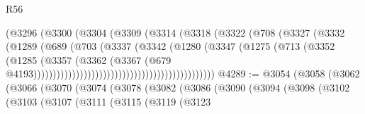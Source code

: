 \begin{lexlean}{R56}
\begin{coremodule}
{{{{{{{{{{{{{{{{{{{{{{{{{{{{{{{{{{{{{{{{{{{{{{{{{{{{{{{{{{{{{{{{{{{{{{{{{{{{{{{{{{{{{{{{{{{{{{{{{{{{{{{{{{{{{{{{{{{{{{{{{{{{{{{{{{{{{{{{{{{{{{{{{{{{{{{{{{{{{{{{{{{{{{{{{{{{{{{{{{{{{{{{{{{{{{{{{{{{{{{{{{{{{{{{{{{                                                (@3296
                                                  (@3300
                                                    (@3304
                                                      (@3309
                                                        (@3314
                                                          (@3318
                                                            (@3322
                                                              (@708
                                                                (@3327
                                                                  (@3332
                                                                    (@1289
                                                                      (@689
                                                                        (@703
                                                                          (@3337
                                                                            (@3342
                                                                              (@1280
                                                                                (@3347
                                                                                  (@1275
                                                                                    (@713
                                                                                      (@3352
                                                                                        (@1285
                                                                                          (@3357
                                                                                            (@3362
                                                                                              (@3367
                                                                                                (@679
                                                                                                  @4193)))))))))))))))))))))))))))))))))))))))))))))))
@4289 := @3054
    (@3058
      (@3062
        (@3066
          (@3070
            (@3074
              (@3078
                (@3082
                  (@3086
                    (@3090
                      (@3094
                        (@3098
                          (@3102
                            (@3103
                              (@3107
                                (@3111
                                  (@3115
                                    (@3119
                                      (@3123
}}}}}}}}}}}}}}}}}}}}}}}}}}}}}}}}}}}}}}}}}}}}}}}}}}}}}}}}}}}}}}}}}}}}}}}}}}}}}}}}}}}}}}}}}}}}}}}}}}}}}}}}}}}}}}}}}}}}}}}}}}}}}}}}}}}}}}}}}}}}}}}}}}}}}}}}}}}}}}}}}}}}}}}}}}}}}}}}}}}}}}}}}}}}}}}}}}}}}}}}}}}}}}}}}}}
\end{coremodule}
\end{lexlean}
